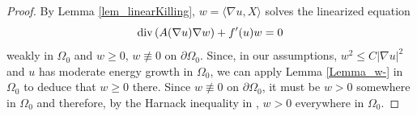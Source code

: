 \documentclass[10 pt,a4paper]{article}
\newtheorem{proposition}[definition]{Proposition}
\theoremstyle{definition}
\begin{document}
\begin{proof}
	By Lemma \ref{lem_linearKilling}, $w = \langle \nabla u,X \rangle$ solves the linearized equation 
	\[
	\mathrm{div} \left( A(\nabla u)\nabla w\right) + f'(u)w = 0
	\]
	weakly in $\Omega_0$ and $w\geq 0$, $w \not \equiv 0$ on $\partial\Omega_0$. Since, in our assumptions, $w^2 \leq C|\nabla u|^2$ and $u$ has moderate energy growth in $\Omega_0$, we can apply Lemma \ref{Lemma_w-} in $\Omega_0$ to deduce that $w \geq 0$ there. Since $w\not\equiv 0$ on $\partial\Omega_0$, it must be $w>0$ somewhere in $\Omega_0$ and therefore, by the Harnack inequality in \cite[Thm. 7.1.2]{pucci_serrin}, $w>0$ everywhere in $\Omega_0$.
\end{proof}


%
%
%
\end{document}
